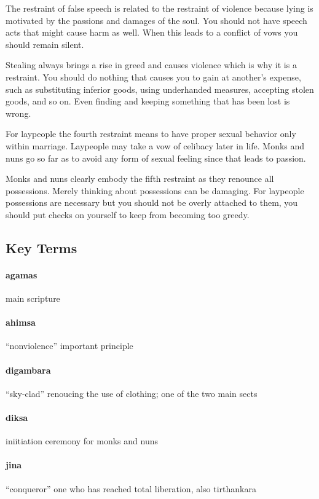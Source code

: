 \documentclass{article}
\begin{document}
The restraint of false speech is related to the restraint of violence because lying is motivated by the passions and damages of the soul. You should not have speech acts that might cause harm as well. When this leads to a conflict of vows you should remain silent.

Stealing always brings a rise in greed and causes violence which is why it is a restraint. You should do nothing that causes you to gain at another's expense, such as substituting inferior goods, using underhanded measures, accepting stolen goods, and so on. Even finding and keeping something that has been lost is wrong.

For laypeople the fourth restraint means to have proper sexual behavior only within marriage. Laypeople may take a vow of celibacy later in life. Monks and nuns go so far as to avoid any form of sexual feeling  since that leads to passion.

Monks and nuns clearly embody the fifth restraint as they renounce all possessions. Merely thinking about possessions can be damaging. For laypeople possessions are necessary but you should not be overly attached to them, you should put checks on yourself to keep from becoming too greedy.

\subsection{Key Terms}
\label{sub:key_terms}
\paragraph{agamas}
\label{par:agamas}
main scripture
\paragraph{ahimsa}
\label{par:ahimsa}
``nonviolence'' important principle
\paragraph{digambara}
\label{par:digambara}
``sky-clad'' renoucing the use of clothing; one of the two main sects
\paragraph{diksa}
\label{par:diksa}
iniitiation ceremony for monks and nuns
\paragraph{jina}
\label{par:jina}
``conqueror'' one who has reached total liberation, also tirthankara
\end{document}

